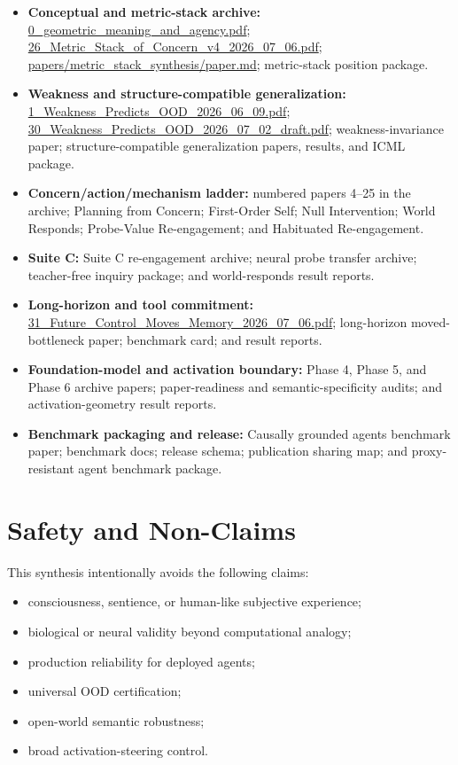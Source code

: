\documentclass[11pt]{article}
\begin{document}
\begin{itemize}
  \item \textbf{Conceptual and metric-stack archive:}
  \url{0_geometric_meaning_and_agency.pdf};
  \url{26_Metric_Stack_of_Concern_v4_2026_07_06.pdf};
  \url{papers/metric_stack_synthesis/paper.md};
  metric-stack position package.
  \item \textbf{Weakness and structure-compatible generalization:}
  \url{1_Weakness_Predicts_OOD_2026_06_09.pdf};
  \url{30_Weakness_Predicts_OOD_2026_07_02_draft.pdf};
  weakness-invariance paper;
  structure-compatible generalization papers, results, and ICML package.
  \item \textbf{Concern/action/mechanism ladder:}
  numbered papers 4--25 in the archive; Planning from Concern; First-Order
  Self; Null Intervention; World Responds; Probe-Value Re-engagement; and
  Habituated Re-engagement.
  \item \textbf{Suite C:}
  Suite C re-engagement archive; neural probe transfer archive; teacher-free
  inquiry package; and world-responds result reports.
  \item \textbf{Long-horizon and tool commitment:}
  \url{31_Future_Control_Moves_Memory_2026_07_06.pdf}; long-horizon
  moved-bottleneck paper; benchmark card; and result reports.
  \item \textbf{Foundation-model and activation boundary:}
  Phase 4, Phase 5, and Phase 6 archive papers; paper-readiness and
  semantic-specificity audits; and activation-geometry result reports.
  \item \textbf{Benchmark packaging and release:}
  Causally grounded agents benchmark paper; benchmark docs; release schema;
  publication sharing map; and proxy-resistant agent benchmark package.
\end{itemize}

\section{Safety and Non-Claims}

This synthesis intentionally avoids the following claims:

\begin{itemize}
  \item consciousness, sentience, or human-like subjective experience;
  \item biological or neural validity beyond computational analogy;
  \item production reliability for deployed agents;
  \item universal OOD certification;
  \item open-world semantic robustness;
  \item broad activation-steering control.
\end{itemize}
\end{document}
